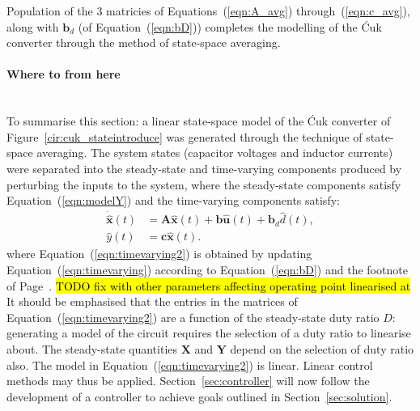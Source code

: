 Population of the 3 matricies of Equations~(\ref{eqn:A_avg}) through~(\ref{eqn:c_avg}), along with $\boldsymbol{b}_d$ (of Equation~(\ref{eqn:bD})) completes the modelling of the \'{C}uk converter through the method of state-space averaging.
\paragraph{Where to from here}
~\\
To summarise this section: a linear state-space model of the \'Cuk converter of Figure~\ref{cir:cuk_stateintroduce} was generated through the technique of state-space averaging. The system states (capacitor voltages and inductor currents) were separated into the steady-state and time-varying components produced by perturbing the inputs to the system, where the steady-state components satisfy Equation~(\ref{eqn:modelY}) and the time-varying components satisfy:
\begin{align}
\dot{\hat{\boldsymbol{x}}}(t)
&= \boldsymbol{A} \hat{\boldsymbol{x}}(t) + \boldsymbol{b} \hat{\boldsymbol{u}}(t)
+ \boldsymbol{b}_d \hat{d}(t),\nonumber
\\[11pt]
\hat{y}(t) &= \boldsymbol{c} \hat{\boldsymbol{x}}(t).\label{eqn:timevarying2}
\end{align}
where Equation~(\ref{eqn:timevarying2}) is obtained by updating Equation~(\ref{eqn:timevarying}) according to Equation~(\ref{eqn:bD}) and the footnote of Page~\pageref{eqn:timevarying}.
\newpar
\hl{TODO fix with other parameters affecting operating point linearised at}
\newpar
It should be emphasised that the entries in the matrices of Equation~(\ref{eqn:timevarying2}) are a function of the steady-state duty ratio $D$: generating a model of the circuit requires the selection of a duty ratio to linearise about. The steady-state quantities $\boldsymbol{X}$ and $\boldsymbol{Y}$ depend on the selection of duty ratio also.
\newpar
The model in Equation~(\ref{eqn:timevarying2}) is linear. Linear control methods may thus be applied. Section~\ref{sec:controller} will now follow the development of a controller to achieve goals outlined in Section~\ref{sec:solution}.